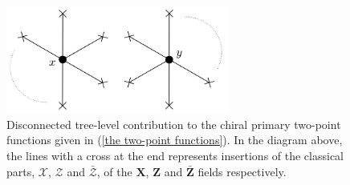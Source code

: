 %
%
\begin{figure}
%
\begin{center}
%
\includegraphics[width=0.65\textwidth]{../pics/tree_level_disconnected_diagram.png}
%
\caption[Disconnected tree-level chiral primary two-point functions]{Disconnected tree-level contribution to the chiral primary two-point functions given in (\ref{the two-point functions}). In the diagram above, the lines with a cross at the end represents insertions of the classical parts, $\mathcal{X}$, $\mathcal{Z}$ and $\bar{\mathcal{Z}}$, of the $\boldsymbol{X}$, $\boldsymbol{Z}$ and $\boldsymbol{\bar{Z}}$ fields respectively.}
%
\label{fig:tree_level_disconnected_diagram}
%
\end{center}
%
\end{figure}
%
%

